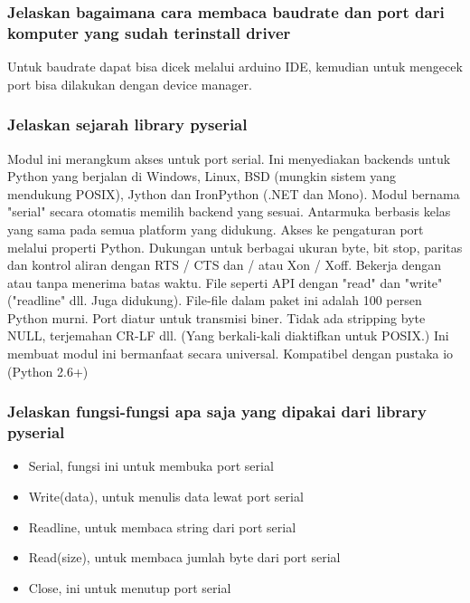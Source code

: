 \subsubsection{Jelaskan bagaimana cara membaca baudrate dan port dari komputer yang sudah terinstall driver}
Untuk baudrate dapat bisa dicek melalui arduino IDE, kemudian untuk mengecek port bisa dilakukan dengan device manager.

\subsubsection{Jelaskan sejarah library pyserial}
Modul ini merangkum akses untuk port serial. Ini menyediakan backends untuk Python yang berjalan di Windows, Linux, BSD (mungkin sistem yang mendukung POSIX), Jython dan IronPython (.NET dan Mono). Modul bernama "serial" secara otomatis memilih backend yang sesuai. Antarmuka berbasis kelas yang sama pada semua platform yang didukung.
Akses ke pengaturan port melalui properti Python. Dukungan untuk berbagai ukuran byte, bit stop, paritas dan kontrol aliran dengan RTS / CTS dan / atau Xon / Xoff. Bekerja dengan atau tanpa menerima batas waktu.
File seperti API dengan "read" dan "write" ("readline" dll. Juga didukung). File-file dalam paket ini adalah 100 persen Python murni. Port diatur untuk transmisi biner. Tidak ada stripping byte NULL, terjemahan CR-LF dll. (Yang berkali-kali diaktifkan untuk POSIX.) Ini membuat modul ini bermanfaat secara universal. Kompatibel dengan pustaka io (Python 2.6+)

\subsubsection{Jelaskan fungsi-fungsi apa saja yang dipakai dari library pyserial}
\begin{itemize}
    \item Serial, fungsi ini untuk membuka port serial
    \item Write(data),  untuk menulis data lewat port serial
    \item Readline, untuk membaca string dari port serial
    \item Read(size), untuk membaca jumlah byte dari port serial
    \item Close, ini untuk menutup port serial 
\end{itemize}

